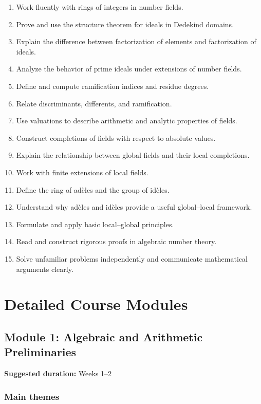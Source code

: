 \documentclass[11pt]{article}
\begin{document}
\begin{enumerate}
    \item Work fluently with rings of integers in number fields.
    \item Prove and use the structure theorem for ideals in Dedekind domains.
    \item Explain the difference between factorization of elements and
          factorization of ideals.
    \item Analyze the behavior of prime ideals under extensions of number
          fields.
    \item Define and compute ramification indices and residue degrees.
    \item Relate discriminants, differents, and ramification.
    \item Use valuations to describe arithmetic and analytic properties of
          fields.
    \item Construct completions of fields with respect to absolute values.
    \item Explain the relationship between global fields and their local
          completions.
    \item Work with finite extensions of local fields.
    \item Define the ring of adèles and the group of idèles.
    \item Understand why adèles and idèles provide a useful global--local
          framework.
    \item Formulate and apply basic local--global principles.
    \item Read and construct rigorous proofs in algebraic number theory.
    \item Solve unfamiliar problems independently and communicate mathematical
          arguments clearly.
\end{enumerate}

\section{Detailed Course Modules}

\subsection{Module 1: Algebraic and Arithmetic Preliminaries}

\textbf{Suggested duration:} Weeks 1--2

\subsubsection*{Main themes}
\end{document}

